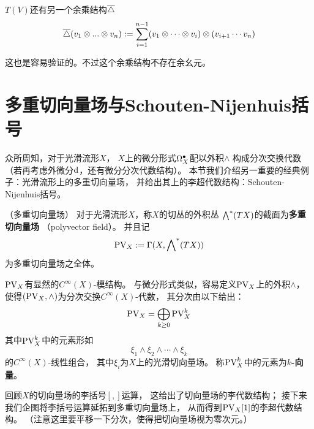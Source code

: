 \begin{rem}%
$T(V)$还有另一个余乘结构$\overline{\triangle}$
$$\overline{\triangle}(v_1\otimes...\otimes v_n)
:=
\sum_{i=1}^{n-1}(v_1\otimes\cdots\otimes v_i)\otimes(v_{i+1}\cdots v_n)$$
\end{rem}
这也是容易验证的。不过这个余乘结构不存在余幺元。


\section{多重切向量场与Schouten-Nijenhuis括号}

众所周知，对于光滑流形$X$，
$X$上的微分形式$\Omega^{\bullet}_X$配以外积$\wedge$
构成分次交换代数（若再考虑外微分$\mathrm{d}$，还有微分分次代数结构）。
本节我们介绍另一重要的经典例子：光滑流形上的多重切向量场，
并给出其上的李超代数结构：Schouten-Nijenhuis括号。


\begin{definition}（多重切向量场）
对于光滑流形$X$，称$X$的切丛的外积丛
$\bigwedge\nolimits^{*}(TX)$的截面为\textbf{多重切向量场}
（polyvector field）。
并且记
$$\operatorname{PV}_X:=\Gamma(X,\bigwedge\nolimits^{*}(TX))$$
为多重切向量场之全体。
\end{definition}

$\operatorname{PV}_X$有显然的$C^{\infty}(X)$-模结构。
与微分形式类似，容易定义$\operatorname{PV}_X$上的外积$\wedge$，
使得$(\operatorname{PV}_X,\wedge)$为分次交换$C^{\infty}(X)$-代数，
其分次由以下给出：
$$\operatorname{PV}_X=\bigoplus_{k\geq 0}\operatorname{PV}^k_X$$
其中$\operatorname{PV}^k_X$中的元素形如
$$\xi_1\wedge\xi_2\wedge\cdots\wedge\xi_k$$
的$C^{\infty}(X)$-线性组合，
其中$\xi_i$为$X$上的光滑切向量场。
称$\operatorname{PV}^k_X$中的元素为\textbf{$k$-向量}。

回顾$X$的切向量场的李括号$[,]$运算，
这给出了切向量场的李代数结构；
接下来我们企图将李括号运算延拓到多重切向量场上，
从而得到$\operatorname{PV}_X[1]$的李超代数结构。
（注意这里要平移一下分次，使得把切向量场视为零次元。）

